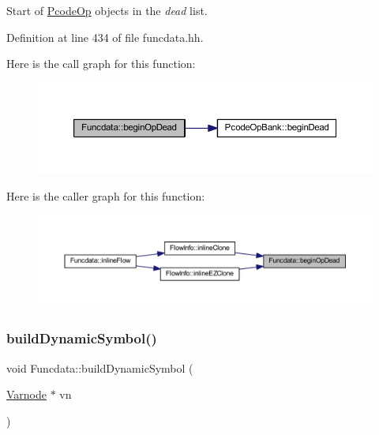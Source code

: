 Start of \mbox{\hyperlink{class_pcode_op}{Pcode\+Op}} objects in the {\itshape dead} list. 



Definition at line 434 of file funcdata.\+hh.

Here is the call graph for this function\+:
\nopagebreak
\begin{figure}[H]
\begin{center}
\leavevmode
\includegraphics[width=350pt]{class_funcdata_a2f98b1b212ede713c3fe936bc2c7e2ea_cgraph}
\end{center}
\end{figure}
Here is the caller graph for this function\+:
\nopagebreak
\begin{figure}[H]
\begin{center}
\leavevmode
\includegraphics[width=350pt]{class_funcdata_a2f98b1b212ede713c3fe936bc2c7e2ea_icgraph}
\end{center}
\end{figure}
\mbox{\label{class_funcdata_aa15db3d569027578de69c065fc607c63}} 
\subsubsection{\texorpdfstring{buildDynamicSymbol()}{buildDynamicSymbol()}}
{\footnotesize\ttfamily void Funcdata\+::build\+Dynamic\+Symbol (\begin{DoxyParamCaption}\item[{\mbox{\hyperlink{class_varnode}{Varnode}} $\ast$}]{vn }\end{DoxyParamCaption})}



